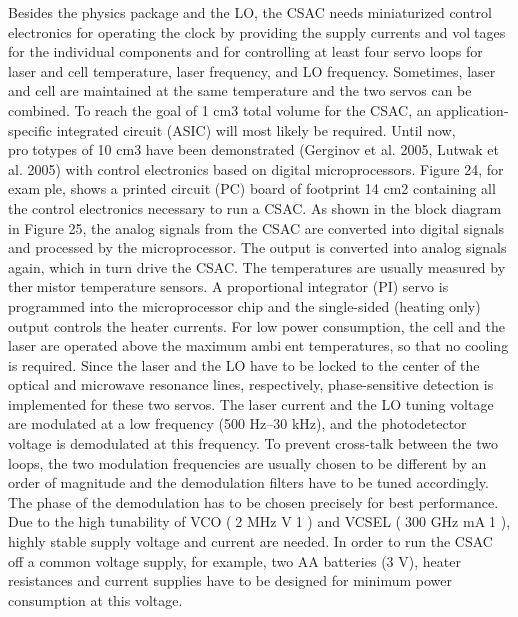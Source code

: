 Besides the physics package and the LO, the CSAC needs miniaturized control electronics for operating the clock by providing the supply currents and voltages for the individual components and for controlling at least four servo loops for laser and cell temperature, laser frequency, and LO frequency.
Sometimes, laser and cell are maintained at the same temperature and the two servos can be combined.
To reach the goal of 1 cm3 total volume for the CSAC, an application-specific integrated circuit (ASIC) will most likely be required.
Until now, prototypes of 10 cm3 have been demonstrated (Gerginov et al. 2005, Lutwak et al. 2005) with control electronics based on digital microprocessors.
Figure 24, for example, shows a printed circuit (PC) board of footprint 14 cm2 containing all the control electronics necessary to run a CSAC.
As shown in the block diagram in Figure 25, the analog signals from the CSAC are converted into digital signals and processed by the microprocessor.
The output is converted into analog signals again, which in turn drive the CSAC.
The temperatures are usually measured by thermistor temperature sensors.
A proportional integrator (PI) servo is programmed into the microprocessor chip and the single-sided (heating only) output controls the heater currents.
For low power consumption, the cell and the laser are operated above the maximum ambient temperatures, so that no cooling is required.
Since the laser and the LO have to be locked to the center of the optical and microwave resonance lines, respectively, phase-sensitive detection is implemented for these two servos.
The laser current and the LO tuning voltage are modulated at a low frequency (500 Hz–30 kHz), and the photodetector voltage is demodulated at this frequency.
To prevent cross-talk between the two loops, the two modulation frequencies are usually chosen to be different by an order of magnitude and the demodulation filters have to be tuned accordingly.
The phase of the demodulation has to be chosen precisely for best performance.
Due to the high tunability of VCO (2 MHz V1 ) and VCSEL (300 GHz mA1 ), highly stable supply voltage and current are needed.
In order to run the CSAC off a common voltage supply, for example, two AA batteries (3 V), heater resistances and current supplies have to be designed for minimum power consumption at this voltage.